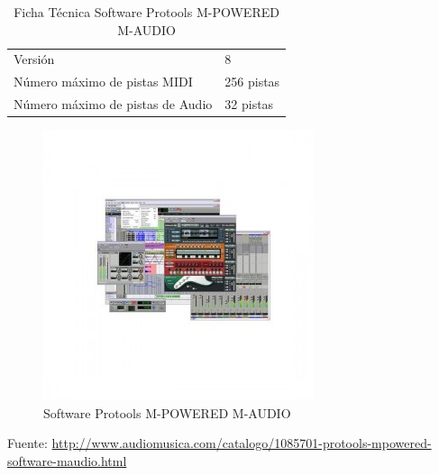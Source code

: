 \begin{table}[htb!]
\centering
\begin{tabular}{|l|l|}
\hline
Versión & 8 \\
Número máximo de pistas MIDI & 256 pistas \\
Número máximo de pistas de Audio & 32 pistas \\
\hline
\end{tabular}
\caption{Ficha Técnica Software Protools M-POWERED M-AUDIO}
\end{table}

\newpage
\begin{figure}[h!t]
   \centering
  \includegraphics[scale=0.6]{img/protools.jpg}
   \caption{Software Protools M-POWERED M-AUDIO}
   \label{fig:protools}
\end{figure}

Fuente: \url{http://www.audiomusica.com/catalogo/1085701-protools-mpowered-software-maudio.html}
